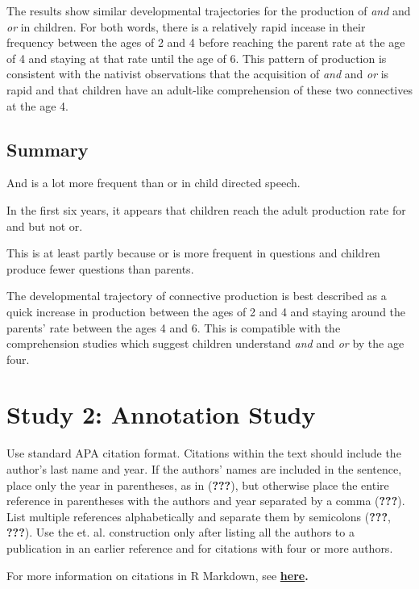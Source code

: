 \documentclass[10pt, letterpaper]{article}
\begin{document}
The results show similar developmental trajectories for the production
of \emph{and} and \emph{or} in children. For both words, there is a
relatively rapid incease in their frequency between the ages of 2 and 4
before reaching the parent rate at the age of 4 and staying at that rate
until the age of 6. This pattern of production is consistent with the
nativist observations that the acquisition of \emph{and} and \emph{or}
is rapid and that children have an adult-like comprehension of these two
connectives at the age 4.

\subsection{Summary}\label{summary}

And is a lot more frequent than or in child directed speech.

In the first six years, it appears that children reach the adult
production rate for and but not or.

This is at least partly because or is more frequent in questions and
children produce fewer questions than parents.

The developmental trajectory of connective production is best described
as a quick increase in production between the ages of 2 and 4 and
staying around the parents' rate between the ages 4 and 6. This is
compatible with the comprehension studies which suggest children
understand \emph{and} and \emph{or} by the age four.

\section{Study 2: Annotation Study}\label{study-2-annotation-study}

Use standard APA citation format. Citations within the text should
include the author's last name and year. If the authors' names are
included in the sentence, place only the year in parentheses, as in
({\textbf{???}}), but otherwise place the entire reference in
parentheses with the authors and year separated by a comma
({\textbf{???}}). List multiple references alphabetically and separate
them by semicolons ({\textbf{???}}, {\textbf{???}}). Use the et. al.
construction only after listing all the authors to a publication in an
earlier reference and for citations with four or more authors.

For more information on citations in R Markdown, see
\textbf{\href{http://rmarkdown.rstudio.com/authoring_bibliographies_and_citations.html\#citations}{here}.}
\end{document}
